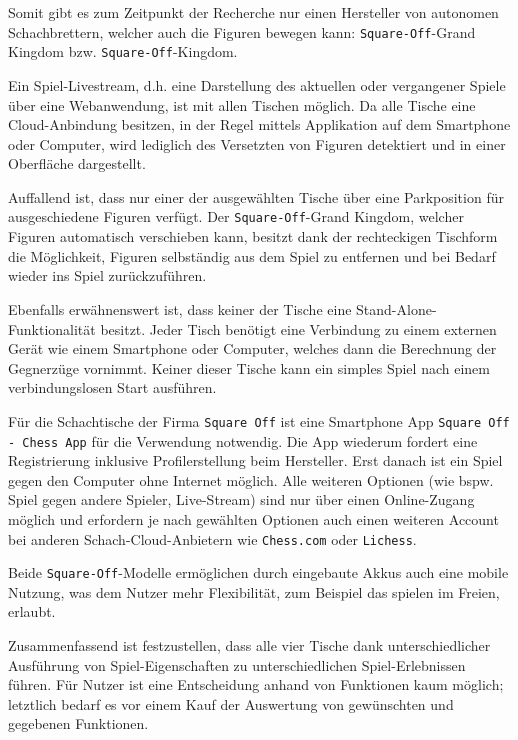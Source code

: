 Somit gibt es zum Zeitpunkt der Recherche nur einen Hersteller von
autonomen Schachbrettern, welcher auch die Figuren bewegen kann:
\passthrough{\lstinline!Square-Off!}-Grand Kingdom bzw.
\passthrough{\lstinline!Square-Off!}-Kingdom.

Ein Spiel-Livestream, d.h. eine Darstellung des aktuellen oder
vergangener Spiele über eine Webanwendung, ist mit allen Tischen
möglich. Da alle Tische eine Cloud-Anbindung besitzen, in der Regel
mittels Applikation auf dem Smartphone oder Computer, wird lediglich des
Versetzten von Figuren detektiert und in einer Oberfläche dargestellt.

Auffallend ist, dass nur einer der ausgewählten Tische über eine
Parkposition für ausgeschiedene Figuren verfügt. Der
\passthrough{\lstinline!Square-Off!}-Grand Kingdom, welcher Figuren
automatisch verschieben kann, besitzt dank der rechteckigen Tischform
die Möglichkeit, Figuren selbständig aus dem Spiel zu entfernen und bei
Bedarf wieder ins Spiel zurückzuführen.

Ebenfalls erwähnenswert ist, dass keiner der Tische eine
Stand-Alone-Funktionalität besitzt. Jeder Tisch benötigt eine Verbindung
zu einem externen Gerät wie einem Smartphone oder Computer, welches dann
die Berechnung der Gegnerzüge vornimmt. Keiner dieser Tische kann ein
simples Spiel nach einem verbindungslosen Start ausführen.

Für die Schachtische der Firma \passthrough{\lstinline!Square Off!} ist
eine Smartphone App
\passthrough{\lstinline!Square Off - Chess App!}\cite{squareoffapp}
für die Verwendung notwendig. Die App wiederum fordert eine
Registrierung inklusive Profilerstellung beim Hersteller. Erst danach
ist ein Spiel gegen den Computer ohne Internet möglich. Alle weiteren
Optionen (wie bspw. Spiel gegen andere Spieler, Live-Stream) sind nur
über einen Online-Zugang möglich und erfordern je nach gewählten
Optionen auch einen weiteren Account bei anderen Schach-Cloud-Anbietern
wie \passthrough{\lstinline!Chess.com!} oder
\passthrough{\lstinline!Lichess!}.

\pagebreak

Beide \passthrough{\lstinline!Square-Off!}-Modelle ermöglichen durch
eingebaute Akkus auch eine mobile Nutzung, was dem Nutzer mehr
Flexibilität, zum Beispiel das spielen im Freien, erlaubt.

Zusammenfassend ist festzustellen, dass alle vier Tische dank
unterschiedlicher Ausführung von Spiel-Eigenschaften zu
unterschiedlichen Spiel-Erlebnissen führen. Für Nutzer ist eine
Entscheidung anhand von Funktionen kaum möglich; letztlich bedarf es vor
einem Kauf der Auswertung von gewünschten und gegebenen Funktionen.

